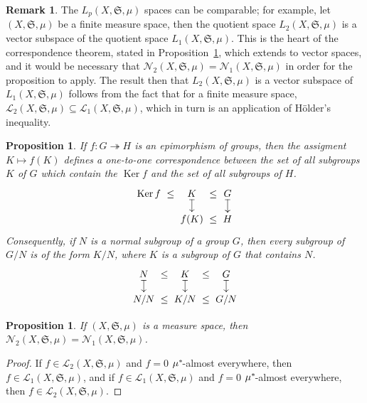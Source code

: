 \documentclass[
twoside=true,
paper=letter,
fontsize=11pt,
pagesize=auto,
leqno,
openany,
headsepline,
overfullrule,
]{scrbook}
\theoremstyle{plain}
\theoremstyle{plain}
\newtheorem{prop}[thm]{Proposition}
\theoremstyle{definition}
\newtheorem{rmk}[thm]{Remark}
\theoremstyle{bfnoteitalic}
\theoremstyle{bfnoteroman}
\newcommand{\sigalg}[1]{\mathfrak{#1}}
\newcommand{\cali}[1]{\mathscr{#1}}
\DeclareMathOperator{\kernel}{Ker}
\newcommand{\semiring}{\sigalg{S}}
\newcommand{\kernast}{\ast\kern-1pt}
\newcommand{\measurespace}{X}
\newcommand{\measure}{\mu}
\begin{document}
\begin{rmk}
The $L_p(\measurespace, \semiring, \measure)$ spaces can be comparable; for example, let $(\measurespace, \semiring, \measure)$ be a finite measure space, then the quotient space $L_2(\measurespace, \semiring, \measure)$ is a vector subspace of the quotient space
$L_1(\measurespace, \semiring, \measure)$. This is the heart of the correspondence theorem, stated in Proposition~\ref{correspondence_theorem},  which extends to vector spaces, and it would be necessary that 
$\cali{N}_2(\measurespace, \semiring, \measure) = \cali{N}_1(\measurespace, \semiring, \measure)$
in order for the proposition to apply.
The result then that 
$L_2(\measurespace, \semiring, \measure)$ is a vector subspace of
$L_1(\measurespace, \semiring, \measure)$ follows from the fact that for a finite measure space, 
$\cali{L}_2(\measurespace, \semiring, \measure)
\subseteq
\cali{L}_1(\measurespace, \semiring, \measure)$, which in turn is an application of H\"older's inequality.
\end{rmk}


\begin{prop}\label{correspondence_theorem}
If $f:G\twoheadrightarrow H$ is an epimorphism of groups, then the assigment $K\mapsto f(K)$ defines a one-to-one correspondence between the set of all subgroups $K$ of $G$ which contain the $\kernel f$ and the set of all subgroups of $H$. 
\[
\xymatrix@R=10pt@C=0pt{ 
\kernel f  & \leq  & K \ar@{|->}[d] & \leq & G \ar@{|->}[d]\\
 &  & f(K) & \leq & H\\
}
\]
Consequently, if $N$ is a normal subgroup of a group $G$, then every subgroup of $G/N$ is of the form $K/N$, where $K$ is a subgroup of $G$ that contains $N$. 
\[
\xymatrix@R=10pt@C=0pt{ 
N \ar@{|->}[d] & \leq  & K \ar@{|->}[d] & \leq & G \ar@{|->}[d]\\
N/N & \leq & K/N & \leq & G/N\\
}
\]
\end{prop}



\begin{prop}
If $(\measurespace, \semiring, \measure)$ is a measure space, then
$\cali{N}_2(\measurespace, \semiring, \measure) = \cali{N}_1(\measurespace, \semiring, \measure)$.
\end{prop}

\begin{proof}
If 
$f\in \cali{L}_2(\measurespace, \semiring, \measure)$ and $f=0$ $\measure^\kernast$-almost everywhere, then $f\in \cali{L}_1(\measurespace, \semiring, \measure)$, and if 
$f\in \cali{L}_1(\measurespace, \semiring, \measure)$ and $f=0$ $\measure^\kernast$-almost everywhere, then $f\in \cali{L}_2(\measurespace, \semiring, \measure)$.
\end{proof}
\end{document}
